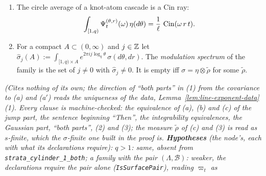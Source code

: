 \begin{proposition}
\begin{enumerate}
(Both parts.) $\Psi_{\lambda t}(\omega) = \Psi_t(\lambda\omega)$ for all $\lambda, t > 0$ iff
(a) and (a$'$) hold.
\item The circle average of a knot-atom cascade is a Cin ray:
\begin{equation}\label{eq:line-e5}
  \int_{[1,q)}\Psi^{(\theta,r)}_t(\omega)\,\eta(d\theta) = \frac1\ell\,\operatorname{Cin}(\omega\,r\,t).
\end{equation}
\item For a compact $A \subset (0,\infty)$ and $j \in \mathbb{Z}$ let
$\widehat\sigma_j(A) := \int_{[1,q) \times A}e^{2\pi ij\log_q\theta}\,\sigma(d\theta,dr)$. The
\emph{modulation spectrum} of the family is the set of $j \ne 0$ with $\widehat\sigma_j \ne 0$. It
is empty iff $\sigma = \eta \otimes \tilde\rho$ for some $\tilde\rho$.
\end{enumerate}
\statusT\quad\emph{(Cites nothing of its own; the direction of ``both parts'' in (1) from the
covariance to (a) and (a$'$) reads the uniqueness of the data, Lemma~\ref{lem:line-exponent-data}(1).
Every clause is machine-checked: the equivalence of (a), (b) and (c) of the jump part, the sentence
beginning ``Then'', the integrability equivalences, the Gaussian part, ``both parts'', (2) and (3);
the measure $\tilde\rho$ of (c) and (3) is read as $s$-finite, which the $\sigma$-finite one built
in the proof is. \textbf{Hypotheses} (the node's, each with what its declarations require): $q > 1$:
same, absent from \texttt{strata\_cylinder\_1\_both}; a family with the pair $(\Lambda, \mathcal{B})$:
weaker, the declarations require the pair alone (\texttt{IsSurfacePair}), reading $\varpi_t$ as
}
\end{proposition}
